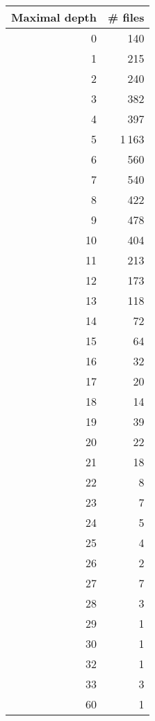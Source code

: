 \begin{tabular}{|r|r|}
\hline
\bf Maximal depth&\bf \# files\\
\hline
0&140\\
\hline
1&215\\
\hline
2&240\\
\hline
3&382\\
\hline
4&397\\
\hline
5&1\,163\\
\hline
6&560\\
\hline
7&540\\
\hline
8&422\\
\hline
9&478\\
\hline
10&404\\
\hline
11&213\\
\hline
12&173\\
\hline
13&118\\
\hline
14&72\\
\hline
15&64\\
\hline
16&32\\
\hline
17&20\\
\hline
18&14\\
\hline
19&39\\
\hline
20&22\\
\hline
21&18\\
\hline
22&8\\
\hline
23&7\\
\hline
24&5\\
\hline
25&4\\
\hline
26&2\\
\hline
27&7\\
\hline
28&3\\
\hline
29&1\\
\hline
30&1\\
\hline
32&1\\
\hline
33&3\\
\hline
60&1\\
\hline
\end{tabular}

